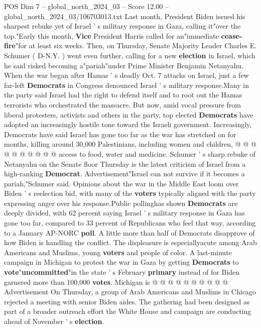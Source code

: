 \begin{textsample}{POS Dim 7 – global\_north\_2024\_03 – Score 12.00 – global\_north\_2024\_03/106703013.txt}  \label{ex:f7_pos_037}
Last month, President Biden issued his sharpest rebuke yet of Israel ' s military response in Gaza, calling it"over the top."Early this month, \textbf{Vice} President Harris called for an"immediate \textbf{cease-fire}"for at least six weeks.
Then, on Thursday, Senate Majority Leader Charles E.
Schumer ( D-N.Y. ) went even further, calling for a new \textbf{election} in Israel, which he said risked becoming a"pariah"under Prime Minister Benjamin Netanyahu.
When the war began after Hamas ' s deadly Oct. 7 attacks on Israel, just a few far-left \textbf{Democrats} in Congress denounced Israel ' s military response.Many in the party said Israel had the right to defend itself and to root out the Hamas terrorists who orchestrated the massacre.
But now, amid vocal pressure from liberal protesters, activists and others in the party, top elected \textbf{Democrats} have adopted an increasingly hostile tone toward the Israeli government.
Increasingly, Democrats have said Israel has gone too far as the war has stretched on for months, killing around 30,000 Palestinians, including women and children, @ @ @ @ @ @ @ @ @ @ access to food, water and medicine.
Schumer ' s sharp rebuke of Netanyahu on the Senate floor Thursday is the latest criticism of Israel from a high-ranking \textbf{Democrat}.
Advertisement"Israel can not survive if it becomes a pariah,"Schumer said.
Opinions about the war in the Middle East loom over Biden ' s reelection bid, with many of the \textbf{voters} typically aligned with the party expressing anger over his response.Public pollinghas shown \textbf{Democrats} are deeply divided, with 62 percent saying Israel ' s military response in Gaza has gone too far, compared to 33 percent of Republicans who feel that way, according to a January AP-NORC \textbf{poll}.
A little more than half of Democrats disapprove of how Biden is handling the conflict.
The displeasure is especiallyacute among Arab Americans and Muslims, young \textbf{voters} and people of color.
A last-minute campaign in Michigan to protest the war in Gaza by getting \textbf{Democrats} to \textbf{vote}"\textbf{uncommitted}"in the state ' s February \textbf{primary} instead of for Biden garnered more than 100,000 \textbf{votes}.
Michigan is @ @ @ @ @ @ @ @ @ @ Advertisement On Thursday, a group of Arab Americans and Muslims in Chicago rejected a meeting with senior Biden aides.
The gathering had been designed as part of a broader outreach effort the White House and campaign are conducting ahead of November ' s \textbf{election}.

\end{textsample}
